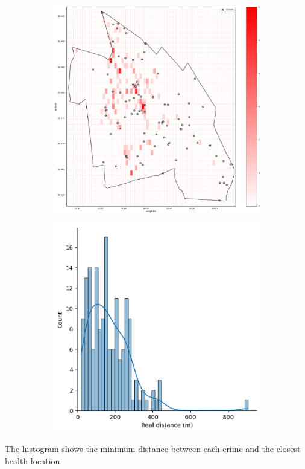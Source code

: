 \begin{figure}[h]
    \centering
    \begin{subfigure}[b]{0.45\textwidth}
        \centering
        \includegraphics[width=\textwidth]{./figures/Gerard/health.png}
        \caption{}
        \label{fig:image1}
    \end{subfigure}
    \hfill
    \begin{subfigure}[b]{0.45\textwidth}
        \centering
        \includegraphics[width=\textwidth]{./figures/Gerard/health_1.png}
        \caption{}
        \label{fig:image2}
    \end{subfigure}

\end{figure}
The histogram shows the minimum distance between each crime and the closest health location. 

